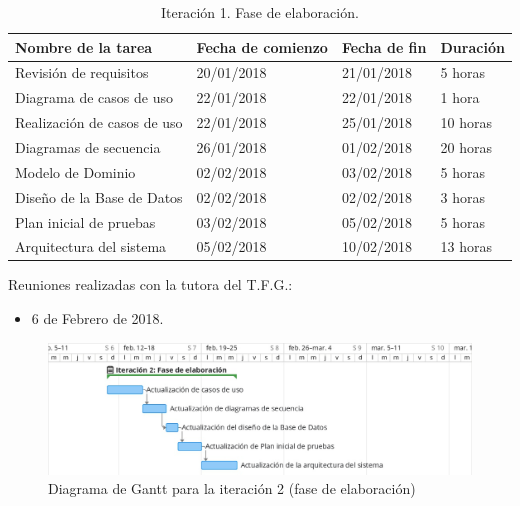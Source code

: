 \documentclass[twoside]{report}
\begin{document}
\begin{table}[H]
\centering
\begin{tabular}{|l|l|l|l|}
\hline
Nombre de la tarea          & Fecha de comienzo & Fecha de fin & Duración \\ \hline
Revisión de requisitos      & 20/01/2018        & 21/01/2018   & 5 horas   \\ \hline
Diagrama de casos de uso    & 22/01/2018        & 22/01/2018   & 1 hora   \\ \hline
Realización de casos de uso & 22/01/2018        & 25/01/2018   & 10 horas  \\ \hline
Diagramas de secuencia      & 26/01/2018        & 01/02/2018   & 20 horas  \\ \hline
Modelo de Dominio 			& 02/02/2018        & 03/02/2018   & 5 horas    \\ \hline
Diseño de la Base de Datos  & 02/02/2018        & 02/02/2018   & 3 horas   \\ \hline
Plan inicial de pruebas     & 03/02/2018        & 05/02/2018   & 5 horas   \\ \hline
Arquitectura del sistema    & 05/02/2018        & 10/02/2018   & 13 horas   \\ \hline
\end{tabular}
\caption{Iteración 1. Fase de elaboración.}
\end{table}

Reuniones realizadas con la tutora del T.F.G.:
\begin{itemize}
\item 6 de Febrero de 2018.
\end{itemize}


\begin{figure}[h]
\begin{center}
\includegraphics[width=\textwidth]{images/gantt/ite2}
\caption{Diagrama de Gantt para la iteración 2 (fase de elaboración)}
\end{center}
\end{figure}
\end{document}
